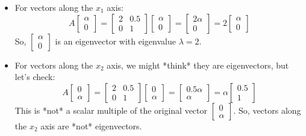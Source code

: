 \documentclass{report}
\begin{document}
{	\begin{itemize}
		\item For vectors along the $x_1$ axis:
		      \[A \begin{bmatrix} \alpha \\ 0 \end{bmatrix} = \begin{bmatrix} 2 & 0.5 \\ 0 & 1 \end{bmatrix} \begin{bmatrix} \alpha \\ 0 \end{bmatrix} = \begin{bmatrix} 2\alpha \\ 0 \end{bmatrix} = 2 \begin{bmatrix} \alpha \\ 0 \end{bmatrix}\]
		      So, $\begin{bmatrix} \alpha \\ 0 \end{bmatrix}$ is an eigenvector with eigenvalue $\lambda = 2$.

		\item For vectors along the $x_2$ axis, we might *think* they are eigenvectors, but let's check:
		      \[A \begin{bmatrix} 0 \\ \alpha \end{bmatrix} = \begin{bmatrix} 2 & 0.5 \\ 0 & 1 \end{bmatrix} \begin{bmatrix} 0 \\ \alpha \end{bmatrix} = \begin{bmatrix} 0.5\alpha \\ \alpha \end{bmatrix} = \alpha \begin{bmatrix} 0.5 \\ 1 \end{bmatrix}\]
		      This is *not* a scalar multiple of the original vector $\begin{bmatrix} 0 \\ \alpha \end{bmatrix}$.  So, vectors along the $x_2$ axis are *not* eigenvectors.


\end{itemize}}
\end{document}
